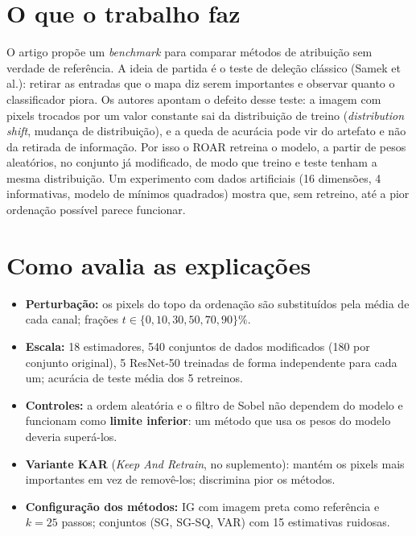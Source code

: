 \documentclass[11pt,a4paper]{article}
\begin{document}
\section{O que o trabalho faz}
O artigo propõe um \textit{benchmark} para comparar métodos de atribuição sem verdade de referência. A ideia de partida é o teste de deleção clássico (Samek et al.): retirar as entradas que o mapa diz serem importantes e observar quanto o classificador piora. Os autores apontam o defeito desse teste: a imagem com pixels trocados por um valor constante sai da distribuição de treino (\textit{distribution shift}, mudança de distribuição), e a queda de acurácia pode vir do artefato e não da retirada de informação. Por isso o ROAR retreina o modelo, a partir de pesos aleatórios, no conjunto já modificado, de modo que treino e teste tenham a mesma distribuição. Um experimento com dados artificiais (16 dimensões, 4 informativas, modelo de mínimos quadrados) mostra que, sem retreino, até a pior ordenação possível parece funcionar.

\section{Como avalia as explicações}
\begin{itemize}
  \item \textbf{Perturbação:} os pixels do topo da ordenação são substituídos pela média de cada canal; frações $t \in \{0, 10, 30, 50, 70, 90\}\%$.
  \item \textbf{Escala:} 18 estimadores, 540 conjuntos de dados modificados (180 por conjunto original), 5 ResNet-50 treinadas de forma independente para cada um; acurácia de teste média dos 5 retreinos.
  \item \textbf{Controles:} a ordem aleatória e o filtro de Sobel não dependem do modelo e funcionam como \textbf{limite inferior}: um método que usa os pesos do modelo deveria superá-los.
  \item \textbf{Variante KAR} (\textit{Keep And Retrain}, no suplemento): mantém os pixels mais importantes em vez de removê-los; discrimina pior os métodos.
  \item \textbf{Configuração dos métodos:} IG com imagem preta como referência e $k = 25$ passos; conjuntos (SG, SG-SQ, VAR) com 15 estimativas ruidosas.
\end{itemize}
\end{document}
